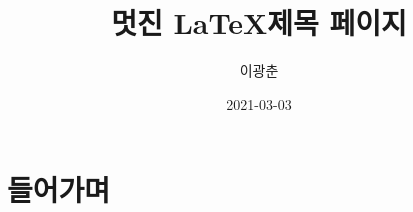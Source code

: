 \documentclass[]{article}
\title{멋진 \LaTeX 제목 페이지}
\author{이광춘}
\date{2021-03-03}
\begin{document}
\maketitle

\begin{abstract}

\blindtext

\end{abstract}

\section{들어가며}

\Blindtext
\end{document}
